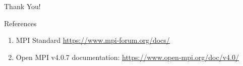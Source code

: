 \documentclass{beamer}
\begin{document}
\begin{frame}
    \centering
    \Huge{Thank You!}
\end{frame}

\begin{frame}{References}
  \begin{enumerate}
    \item MPI Standard \href{https://www.mpi-forum.org/docs/}{https://www.mpi-forum.org/docs/}
    \item Open MPI v4.0.7 documentation: \href{https://www.open-mpi.org/doc/v4.0/}{https://www.open-mpi.org/doc/v4.0/}
  \end{enumerate}
\end{frame}
\end{document}
